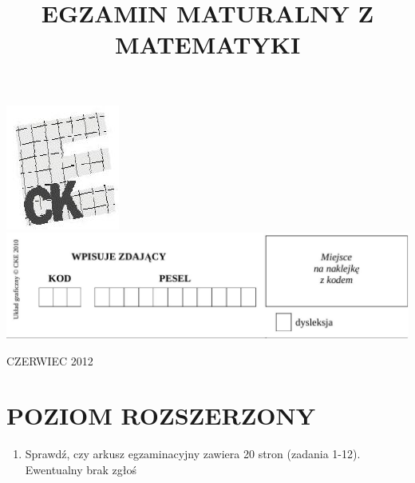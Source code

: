 \documentclass[10pt]{article}
\title{EGZAMIN MATURALNY Z MATEMATYKI }
\author{}
\date{}
\begin{document}
\maketitle
\includegraphics[max width=\textwidth, center]{2024_11_21_d9af6ed2d610d3f2d2cbg-01}\\
\includegraphics[max width=\textwidth, center]{2024_11_21_d9af6ed2d610d3f2d2cbg-01(1)}

CZERWIEC 2012

\section*{POZIOM ROZSZERZONY}
\begin{enumerate}
  \item Sprawdź, czy arkusz egzaminacyjny zawiera 20 stron (zadania 1-12). Ewentualny brak zgłoś
\end{enumerate}
\end{document}
